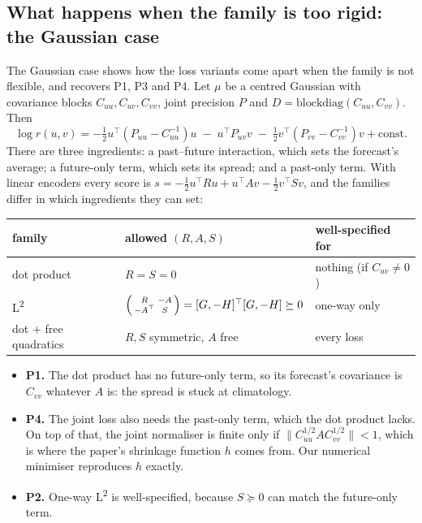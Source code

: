 \documentclass[11pt]{article}
\newcommand{\Ltwo}{L\textsuperscript{2}}
\theoremstyle{plain}
\theoremstyle{definition}
\theoremstyle{remark}
\begin{document}
\subsection{What happens when the family is too rigid: the Gaussian case}

The Gaussian case shows how the loss variants come apart when the family is not flexible,
and recovers P1, P3 and P4. Let $\mu$ be a centred Gaussian with covariance blocks
$C_{uu},C_{uv},C_{vv}$, joint precision $P$ and $D=\mathrm{blockdiag}(C_{uu},C_{vv})$. Then
\[
  \log r(u,v) = -\tfrac12 u^\top(P_{uu}-C_{uu}^{-1})u \;-\; u^\top P_{uv} v
                \;-\; \tfrac12 v^\top(P_{vv}-C_{vv}^{-1})v + \text{const}.
\]
There are three ingredients: a past--future interaction, which sets the forecast's average;
a future-only term, which sets its spread; and a past-only term. With linear encoders every
score is $s=-\tfrac12 u^\top Ru + u^\top Av - \tfrac12 v^\top Sv$, and the families differ in
which ingredients they can set:
\begin{center}\small
\begin{tabular}{@{}lll@{}}
\toprule
family & allowed $(R,A,S)$ & well-specified for \\
\midrule
dot product & $R=S=0$ & nothing (if $C_{uv}\neq0$) \\
\Ltwo{} & $\begin{psmallmatrix}R&-A\\-A^\top&S\end{psmallmatrix}=[G,-H]^\top[G,-H]\succeq0$ & one-way only \\
dot $+$ free quadratics & $R,S$ symmetric, $A$ free & every loss \\
\bottomrule
\end{tabular}
\end{center}
\begin{itemize}
\item \textbf{P1.} The dot product has no future-only term, so its forecast's covariance is
  $C_{vv}$ whatever $A$ is: the spread is stuck at climatology.
\item \textbf{P4.} The joint loss also needs the past-only term, which the dot product lacks.
  On top of that, the joint normaliser is finite only if
  $\|C_{uu}^{1/2}AC_{vv}^{1/2}\|<1$, which is where the paper's shrinkage function $h$ comes
  from. Our numerical minimiser reproduces $h$ exactly.
\item \textbf{P2.} One-way \Ltwo{} is well-specified, because $S\succeq0$ can match the
  future-only term.
\end{itemize}
\end{document}
